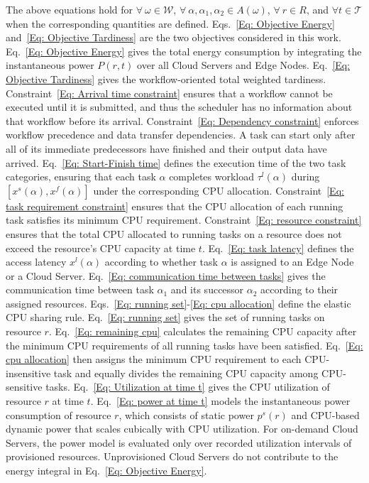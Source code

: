 \documentclass[10pt,journal]{IEEEtran}
\begin{document}
The above equations hold for $\forall\ \omega\in\mathcal{W}$, $\forall\ \alpha,\alpha_1,\alpha_2\in A(\omega)$, $\forall\ r\in R$, and $\forall t\in\mathcal{T}$ when the corresponding quantities are defined. Eqs.~\eqref{Eq: Objective Energy} and~\eqref{Eq: Objective Tardiness} are the two objectives considered in this work. Eq.~\eqref{Eq: Objective Energy} gives the total energy consumption by integrating the instantaneous power $P(r,t)$ over all Cloud Servers and Edge Nodes. Eq.~\eqref{Eq: Objective Tardiness} gives the workflow-oriented total weighted tardiness. Constraint~\eqref{Eq: Arrival time constraint} ensures that a workflow cannot be executed until it is submitted, and thus the scheduler has no information about that workflow before its arrival. Constraint~\eqref{Eq: Dependency constraint} enforces workflow precedence and data transfer dependencies. A task can start only after all of its immediate predecessors have finished and their output data have arrived. Eq.~\eqref{Eq: Start-Finish time} defines the execution time of the two task categories, ensuring that each task $\alpha$ completes workload $\tau^l(\alpha)$ during $[x^s(\alpha),x^f(\alpha)]$ under the corresponding CPU allocation. Constraint~\eqref{Eq: task requirement constraint} ensures that the CPU allocation of each running task satisfies its minimum CPU requirement. Constraint~\eqref{Eq: resource constraint} ensures that the total CPU allocated to running tasks on a resource does not exceed the resource's CPU capacity at time $t$. Eq.~\eqref{Eq: task latency} defines the access latency $x^l(\alpha)$ according to whether task $\alpha$ is assigned to an Edge Node or a Cloud Server. Eq.~\eqref{Eq: communication time between tasks} gives the communication time between task $\alpha_1$ and its successor $\alpha_2$ according to their assigned resources.
Eqs.~\eqref{Eq: running set}-\eqref{Eq: cpu allocation} define the elastic CPU sharing rule. Eq.~\eqref{Eq: running set} gives the set of running tasks on resource $r$. Eq.~\eqref{Eq: remaining cpu} calculates the remaining CPU capacity after the minimum CPU requirements of all running tasks have been satisfied. Eq.~\eqref{Eq: cpu allocation} then assigns the minimum CPU requirement to each CPU-insensitive task and equally divides the remaining CPU capacity among CPU-sensitive tasks. Eq.~\eqref{Eq: Utilization at time t} gives the CPU utilization of resource $r$ at time $t$. Eq.~\eqref{Eq: power at time t} models the instantaneous power consumption of resource $r$, which consists of static power $p^s(r)$ and CPU-based dynamic power that scales cubically with CPU utilization. For on-demand Cloud Servers, the power model is evaluated only over recorded utilization intervals of provisioned resources. Unprovisioned Cloud Servers do not contribute to the energy integral in Eq.~\eqref{Eq: Objective Energy}.
\end{document}
